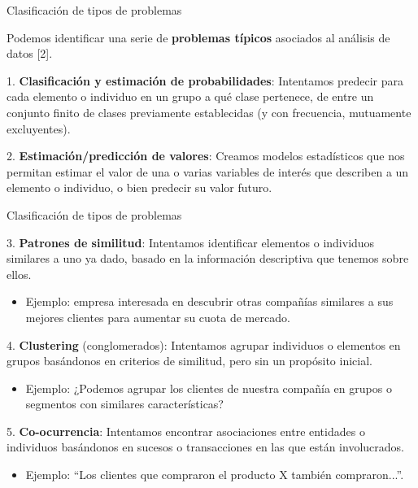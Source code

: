 
\begin{frame}{Clasificación de tipos de problemas}
 \begin{wideitemize}
  \item Podemos identificar una serie de \textbf{problemas típicos} asociados al análisis
  de datos [2].
  
  \item 1. \textbf{Clasificación y estimación de probabilidades}: Intentamos predecir para
  cada elemento o individuo en un grupo a qué clase pertenece, de entre un conjunto
  finito de clases previamente establecidas (y con frecuencia, mutuamente excluyentes).
  
  \item 2. \textbf{Estimación/predicción de valores}: Creamos modelos estadísticos que nos
  permitan estimar el valor de una o varias variables de interés que describen a un
  elemento o individuo, o bien predecir su valor futuro.

 \end{wideitemize}

\end{frame}


\begin{frame}{Clasificación de tipos de problemas}
 \begin{wideitemize}
  \item 3. \textbf{Patrones de similitud}: Intentamos identificar elementos o individuos similares
  a uno ya dado, basado en la información descriptiva que tenemos sobre ellos.
  \begin{itemize}
   \item Ejemplo: empresa interesada en descubrir otras compañías similares a
   sus mejores clientes para aumentar su cuota de mercado.
  \end{itemize}
  
  \item 4. \textbf{Clustering} (conglomerados): Intentamos agrupar individuos o elementos en
  grupos basándonos en criterios de similitud, pero sin un propósito inicial.
  \begin{itemize}
   \item Ejemplo: ¿Podemos agrupar los clientes de nuestra compañía en grupos
   o segmentos con similares características?
  \end{itemize}
  
  \item 5. \textbf{Co-ocurrencia}: Intentamos encontrar asociaciones entre entidades o
  individuos basándonos en sucesos o transacciones en las que están involucrados.
  \begin{itemize}
   \item Ejemplo: ``Los clientes que compraron el producto X también compraron...''.
  \end{itemize}

 \end{wideitemize}

\end{frame}

